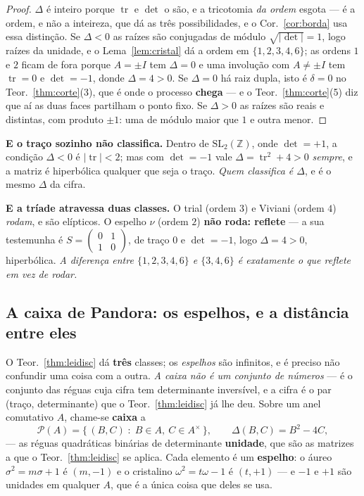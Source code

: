 \documentclass[11pt,a4paper]{article}
\begin{document}
\begin{proof}
$\Delta$ é inteiro porque $\operatorname{tr}$ e $\det$ o são, e a tricotomia
\emph{da ordem} esgota --- é a ordem, e não a inteireza, que dá as três
possibilidades, e o Cor.~\ref{cor:borda} usa essa distinção. Se $\Delta<0$ as raízes são conjugadas de módulo
$\sqrt{\lvert\det\rvert}=1$, logo raízes da unidade, e o Lema~\ref{lem:cristal}
dá a ordem em $\{1,2,3,4,6\}$; as ordens $1$ e $2$ ficam de fora porque $A=\pm I$
tem $\Delta=0$ e uma involução com $A\neq\pm I$ tem $\operatorname{tr}=0$ e
$\det=-1$, donde $\Delta=4>0$. Se $\Delta=0$ há raiz dupla, isto é $\delta=0$ no
Teor.~\ref{thm:corte}(3), que é onde o processo \textbf{chega} --- e o
Teor.~\ref{thm:corte}(5) diz que aí as duas faces partilham o ponto fixo. Se
$\Delta>0$ as raízes são reais e distintas, com produto $\pm1$: uma de módulo
maior que $1$ e outra menor.
\end{proof}

\noindent\textbf{E o traço sozinho não classifica.} Dentro de
$\mathrm{SL}_2(\mathbb{Z})$, onde $\det=+1$, a condição $\Delta<0$ é $\lvert\operatorname{tr}\rvert<2$;
mas com $\det=-1$ vale $\Delta=\operatorname{tr}^{2}+4>0$ \emph{sempre}, e a matriz
é hiperbólica qualquer que seja o traço. \emph{Quem classifica é $\Delta$}, e é o
mesmo $\Delta$ da cifra.

\medskip\noindent\textbf{E a tríade atravessa duas classes.} O trial (ordem $3$) e
Viviani (ordem $4$) \emph{rodam}, e são elípticos. O espelho $\nu$ (ordem $2$)
\textbf{não roda: reflete} --- a sua testemunha é
$S=\left(\begin{smallmatrix}0&1\\1&0\end{smallmatrix}\right)$, de traço $0$ e
$\det=-1$, logo $\Delta=4>0$, hiperbólica. \emph{A diferença entre $\{1,2,3,4,6\}$
e $\{3,4,6\}$ é exatamente o que reflete em vez de rodar.}

\subsection*{A caixa de Pandora: os espelhos, e a distância entre eles}

\noindent O Teor.~\ref{thm:leidisc} dá \textbf{três} classes; os \emph{espelhos}
são infinitos, e é preciso não confundir uma coisa com a outra. \emph{A caixa não
é um conjunto de números} --- é o conjunto das réguas cuja cifra tem
determinante inversível, e a cifra é o par (traço, determinante) que o
Teor.~\ref{thm:leidisc} já lhe deu. Sobre um anel comutativo $A$, chame-se
\textbf{caixa} a
\[
\mathcal{P}(A)=\bigl\{\,(B,C)\;:\;B\in A,\ C\in A^{\times}\,\bigr\},
\qquad
\Delta(B,C)=B^{2}-4C ,
\]
--- as réguas quadráticas binárias de determinante \textbf{unidade}, que são as
matrizes a que o Teor.~\ref{thm:leidisc} se aplica. Cada elemento é um
\textbf{espelho}: o áureo $\sigma^{2}=m\sigma+1$ é $(m,-1)$ e o cristalino
$\omega^{2}=t\omega-1$ é $(t,+1)$ --- e $-1$ e $+1$ são unidades em qualquer $A$,
que é a única coisa que deles se usa.
\end{document}
